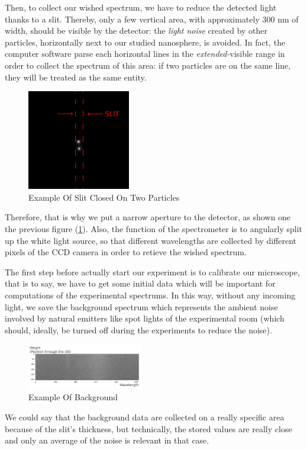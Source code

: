 \documentclass{article}
\numberwithin{equation}{section}
\begin{document}
Then, to collect our wished spectrum, we have to reduce the detected light thanks to a slit. Thereby, only a few vertical area, with approximately $300$ nm of width, should be visible by the detector: the \textit{light noise} created by other particles, horizontally next to our studied nanosphere, is avoided. In fact, the computer software parse each horizontal lines in the \textit{extended-}visible range in order to collect the spectrum of this area: if two particles are on the same line, they will be treated as the same entity.
\begin{figure}[h!]
    \centering
    \includegraphics[width=0.4\textwidth, height=0.35\textwidth]{slit_ex.png}
    \caption{Example Of Slit Closed On Two Particles}
    \label{fig:slit_ex}
\end{figure}
Therefore, that is why we put a narrow aperture to the detector, as shown one the previous figure (\ref{fig:slit_ex}). Also, the function of the spectrometer is to angularly split up the white light source, so that different wavelengths are collected by different pixels of the CCD camera in order to retieve the wished spectrum.

The first step before actually start our experiment is to calibrate our microscope, that is to say, we have to get some initial data which will be important for computations of the experimental spectrums. In this way, without any incoming light, we save the background spectrum which represents the ambient noise involved by natural emitters like spot lights of the experimental room (which should, ideally, be turned off during the experiments to reduce the noise).
\begin{figure}[h!]
    \centering
    \includegraphics[width=0.45\textwidth, height=0.20\textwidth]{background_ex.png}
    \caption{Example Of Background}
    \label{fig:background_ex}
\end{figure}
We could say that the background data are collected on a really specific area because of the slit's thickness, but technically, the stored values are really close and only an average of the noise is relevant in that case.
\end{document}
